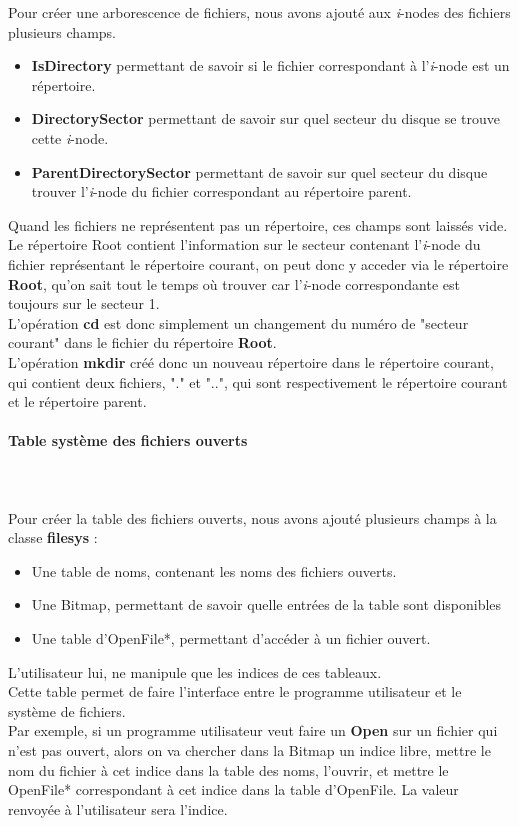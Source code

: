 \documentclass{report}
\newcommand{\myparagraph}[1]{\paragraph*{#1}\mbox{}\\}
\begin{document}
Pour créer une arborescence de fichiers, nous avons ajouté aux \textit{i}-nodes des fichiers plusieurs champs.
\begin{itemize}
\item \textbf{IsDirectory} permettant de savoir si le fichier correspondant à l'\textit{i}-node est un répertoire.
\item \textbf{DirectorySector} permettant de savoir sur quel secteur du disque se trouve cette \textit{i}-node.
\item \textbf{ParentDirectorySector} permettant de savoir sur quel secteur du disque trouver l'\textit{i}-node du fichier correspondant au répertoire parent.
\end{itemize}
Quand les fichiers ne représentent pas un répertoire, ces champs sont laissés vide. \\
Le répertoire Root contient l'information sur le secteur contenant l'\textit{i}-node du fichier représentant le répertoire courant, on peut donc y acceder via le répertoire \textbf{Root}, qu'on sait tout le temps où trouver car l'\textit{i}-node correspondante est toujours sur le secteur 1.	\\	
L'opération \textbf{cd} est donc simplement un changement du numéro de "secteur courant" dans le fichier du répertoire \textbf{Root}.  \\
L'opération \textbf{mkdir} créé donc un nouveau répertoire dans le répertoire courant, qui contient deux fichiers, "." et "..", qui sont respectivement le répertoire courant et le répertoire parent.
	
\myparagraph{Table système des fichiers ouverts}\\	
Pour créer la table des fichiers ouverts, nous avons ajouté plusieurs champs à la classe \textbf{filesys} :
\begin{itemize}
\item Une table de noms, contenant les noms des fichiers ouverts.
\item Une Bitmap, permettant de savoir quelle entrées de la table sont disponibles
\item Une table d'OpenFile*, permettant d’accéder à un fichier ouvert.
\end{itemize}
L'utilisateur lui, ne manipule que les indices de ces tableaux.\\
Cette table permet de faire l'interface entre le programme utilisateur et le système de fichiers.\\

Par exemple, si un programme utilisateur veut faire un \textbf{Open} sur un fichier qui n'est pas ouvert, alors on va chercher dans la Bitmap un indice libre, mettre le nom du fichier à cet indice dans la table des noms, l'ouvrir, et mettre le OpenFile* correspondant à cet indice dans la table d'OpenFile.
La valeur renvoyée à l'utilisateur sera l'indice.\\
\end{document}
